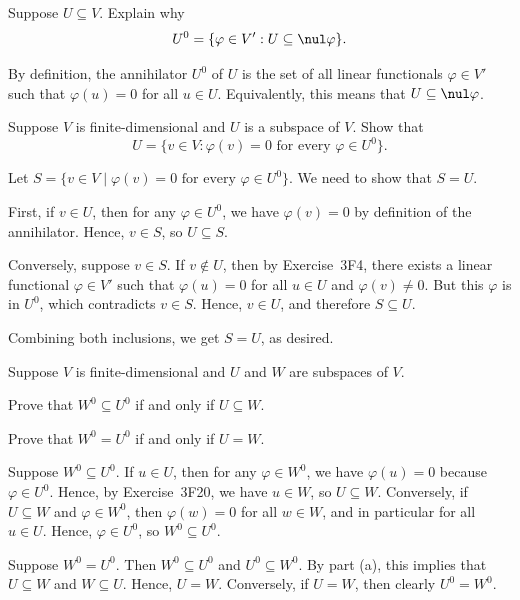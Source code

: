 \begin{exc}
\begin{exercise}
Suppose $U\subseteq V$. Explain why
\[ U^0 = \{\varphi\in V' : U\subseteq\nul\varphi\}. \]
\end{exercise}
\begin{solution}
By definition, the annihilator $U^0$ of $U$ is the set of all linear
functionals $\varphi\in V'$ such that $\varphi(u)=0$ for all $u\in U$.
Equivalently, this means that $U\subseteq\nul\varphi$.
\end{solution}

\begin{exercise}
Suppose $V$ is finite-dimensional and $U$ is a subspace of $V$. Show that
\[ U = \{v\in V : \varphi(v)=0 \text{ for every } \varphi\in U^0\}. \]
\end{exercise}
\begin{solution}
Let $S=\{v\in V \mid \varphi(v)=0 \text{ for every } \varphi\in U^0\}$. We need
to show that $S=U$.

First, if $v\in U$, then for any $\varphi\in U^0$, we have $\varphi(v)=0$ by
definition of the annihilator. Hence, $v\in S$, so $U\subseteq S$.

Conversely, suppose $v\in S$. If $v\notin U$, then by Exercise~3F4, there
exists a linear functional $\varphi\in V'$ such that $\varphi(u)=0$ for all
$u\in U$ and $\varphi(v)\ne0$. But this $\varphi$ is in $U^0$, which
contradicts $v\in S$. Hence, $v\in U$, and therefore $S\subseteq U$.

Combining both inclusions, we get $S=U$, as desired.
\end{solution}

\begin{exercise}
Suppose $V$ is finite-dimensional and $U$ and $W$ are subspaces of $V$.
\begin{parts}
\item Prove that $W^0\subseteq U^0$ if and only if $U\subseteq W$.
\item Prove that $W^0=U^0$ if and only if $U=W$.
\end{parts}
\end{exercise}
\begin{solution}\leavevmode
\begin{parts}
\item Suppose $W^0\subseteq U^0$. If $u\in U$, then for any $\varphi\in W^0$,
  we have $\varphi(u)=0$ because $\varphi\in U^0$. Hence, by Exercise~3F20, we
  have $u\in W$, so $U\subseteq W$. Conversely, if $U\subseteq W$ and
  $\varphi\in W^0$, then $\varphi(w)=0$ for all $w\in W$, and in particular for
  all $u\in U$. Hence, $\varphi\in U^0$, so $W^0\subseteq U^0$.
\item Suppose $W^0=U^0$. Then $W^0\subseteq U^0$ and $U^0\subseteq W^0$. By
  part (a), this implies that $U\subseteq W$ and $W\subseteq U$. Hence, $U=W$.
  Conversely, if $U=W$, then clearly $U^0=W^0$.
\end{parts}
\end{solution}


\end{exc}
